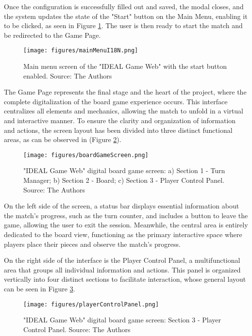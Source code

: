 \documentclass[english]{sbc2025}
\begin{document}
Once the configuration is successfully filled out and saved, the modal closes, and the system updates the state of the "Start" button on the Main Menu, enabling it to be clicked, as seen in Figure \ref{fig_mainMenuI18N}. The user is then ready to start the match and be redirected to the Game Page.

\begin{figure}[h]
  \centering
  \texttt{[image: figures/mainMenuI18N.png]}
  \caption{ Main menu screen of the "IDEAL Game Web" with the start button enabled. Source: The Authors}
  \label{fig_mainMenuI18N}
\end{figure}

The Game Page represents the final stage and the heart of the project, where the complete digitalization of the board game experience occurs. This interface centralizes all elements and mechanics, allowing the match to unfold in a virtual and interactive manner. To ensure the clarity and organization of information and actions, the screen layout has been divided into three distinct functional areas, as can be observed in (Figure \ref{fig_boardGameScreen}).

\begin{figure}[h]
  \centering
  \texttt{[image: figures/boardGameScreen.png]}
  \caption{  "IDEAL Game Web" digital board game screen: a) Section 1 - Turn Manager; b) Section 2 - Board; c) Section 3 - Player Control Panel. Source: The Authors}
  \label{fig_boardGameScreen}
\end{figure}

On the left side of the screen, a status bar displays essential information about the match's progress, such as the turn counter, and includes a button to leave the game, allowing the user to exit the session. Meanwhile, the central area is entirely dedicated to the board view, functioning as the primary interactive space where players place their pieces and observe the match's progress.

On the right side of the interface is the Player Control Panel, a multifunctional area that groups all individual information and actions. This panel is organized vertically into four distinct sections to facilitate interaction, whose general layout can be seen in Figure \ref{fig_playerControlPanel}.

\begin{figure}[h]
  \centering
  \texttt{[image: figures/playerControlPanel.png]}
  \caption{"IDEAL Game Web" digital board game screen: Section 3 - Player Control Panel. Source: The Authors}
  \label{fig_playerControlPanel}
\end{figure}
\end{document}
